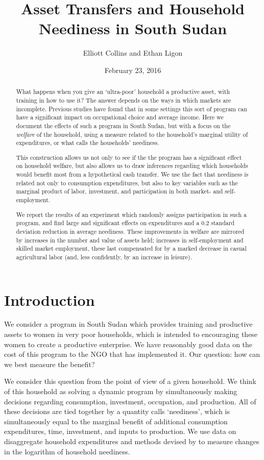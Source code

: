 \documentclass[11pt]{article}
\author{Elliott Collins and Ethan Ligon}
\date{February 23, 2016}
\title{Asset Transfers and Household Neediness in South Sudan}
\begin{document}
\maketitle
\begin{abstract}
What happens when you give an `ultra-poor' household a productive
asset, with training in how to use it?  The answer depends on the
ways in which markets are incomplete.  Previous studies have found
that in some settings this sort of program can have a significant
impact on occupational choice and average income.  Here we document
the effects of such a program in South Sudan, but with a focus on
the \emph{welfare} of the household, using a measure related to the
household's marginal utility of expenditures, or what \cite{ligon16a}
calls the households' neediness.

This construction allows us not only to see if the the program has a
significant effect on household welfare, but also allows us to draw
inferences regarding which households would benefit most from a
hypothetical cash transfer.  We use the fact that neediness is
related not only to consumption expenditures, but also to key
variables such as the marginal product of labor, investment, and
participation in both market- and self-employment.

We report the results of an experiment which randomly assigns
participation in such a program, and find large and significant
effects on expenditures and a 0.2 standard deviation reduction in
average neediness.  These improvements in welfare are mirrored by
increases in the number and value of assets held; increases in
self-employment and skilled market employment, these last
compensated for by a marked decrease in casual agricultural labor
(and, less confidently, by an increase in leisure).
\end{abstract}

\section*{Introduction}
\label{sec-1}
We consider a program in South Sudan which provides training and
productive assets to women in very poor households, which is
intended to encouraging these women to create a productive
enterprise.  We have reasonably good data on the cost of this
program to the NGO that has implemented it.  Our question: how can
we best measure the benefit?

We consider this question from the point of view of a given
household.  We think of this household as solving a dynamic program
by simultaneously making decisions regarding consumption,
investment, occupation, and production.  All of these decisions are
tied together by a quantity \cite{ligon16a} calls `neediness', which
is simultaneously equal to the marginal benefit of additional
consumption expenditures, time, investment, and inputs to
production.  We use data on disaggregate household expenditures and
methods devised by \cite{ligon16a} to measure changes in the
logarithm of household neediness.
\end{document}
